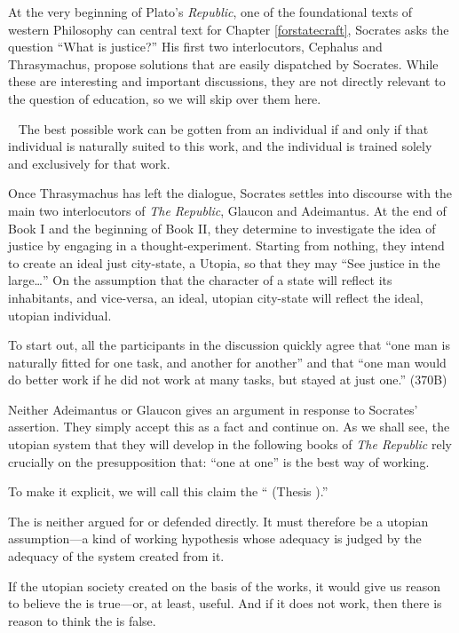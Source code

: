 At the very beginning of Plato's \emph{Republic}, one of the foundational texts of western Philosophy can central text for Chapter \ref{forstatecraft}, Socrates asks the question ``What is justice?'' His first two interlocutors, Cephalus and Thrasymachus, propose solutions that are easily dispatched by Socrates. While these are interesting and important discussions, they are not directly relevant to the question of education, so we will skip over them here.
\begin{thesis} \label{eq:specialization}
The best possible work can be gotten from an individual if and only if that individual is naturally suited to this work, and the individual is trained solely and exclusively for that work.\end{thesis}

Once Thrasymachus has left the dialogue, Socrates settles into discourse with the main two interlocutors of \emph{The Republic}, Glaucon and Adeimantus. At the end of Book I and the beginning of Book II, they determine to investigate the idea of justice by engaging in a thought-experiment. Starting from nothing, they intend to create an ideal just city-state, a Utopia, so that they may ``See justice in the large{\ldots}'' On the assumption that the character of a state will reflect its inhabitants, and vice-versa, an ideal, utopian city-state will reflect the ideal, utopian individual.

To start out, all the participants in the discussion quickly agree that ``one man is naturally fitted for one task, and another for another'' and that ``one man would do better work if he did not work at many tasks, but stayed at just one.'' (370B)

Neither Adeimantus or Glaucon gives an argument in response to Socrates' assertion. They simply accept this as a fact and continue on. As we shall see, the utopian system that they will develop in the following books of \emph{The Republic} rely crucially on the presupposition that: ``one at one'' is the best way of working.

To make it explicit, we will call this claim the `` (Thesis ).''

The  is neither argued for or defended directly. It must therefore be a utopian assumption---a kind of working hypothesis whose adequacy is judged by the adequacy of the system created from it. 

If the utopian society created on the basis of the  works, it would give us reason to believe the  is true---or, at least, useful. And if it does not work, then there is reason to think the  is false. 

